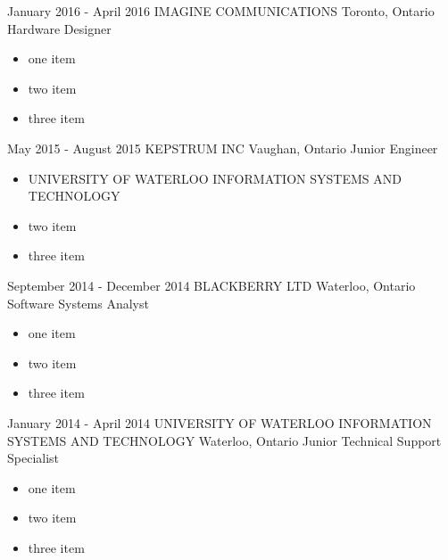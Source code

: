 \documentclass[hidelinks]{kkurucz-cv}
\begin{document}
\begin{entrylist}
\entry
{January 2016 - April 2016}
{IMAGINE COMMUNICATIONS}
{Toronto, Ontario}
{Hardware Designer}
{
\begin{itemize}
	\item one item
	\item two item
	\item three item
\end{itemize}
}

\entry
{May 2015 - August 2015}
{KEPSTRUM INC}
{Vaughan, Ontario}
{Junior Engineer}
{
\begin{itemize}
	\item UNIVERSITY OF WATERLOO INFORMATION SYSTEMS AND TECHNOLOGY
	\item two item
	\item three item
\end{itemize}
}

\entry
{September 2014 - December 2014}
{BLACKBERRY LTD}
{Waterloo, Ontario}
{Software Systems Analyst}
{
\begin{itemize}
	\item one item
	\item two item
	\item three item
\end{itemize}
}

\entry
{January 2014 - April 2014}
{UNIVERSITY OF WATERLOO INFORMATION SYSTEMS AND TECHNOLOGY}
{Waterloo, Ontario}
{Junior Technical Support Specialist}
{
\begin{itemize}
	\item one item
	\item two item
	\item three item
\end{itemize}
}
\end{entrylist}

%
\end{document}
